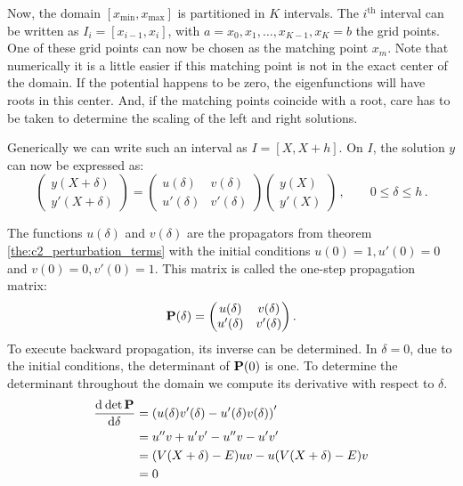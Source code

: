 Now, the domain $[x_\text{min}, x_\text{max}]$ is partitioned in $K$ intervals. The $i^\text{th}$ interval can be written as $I_i = [x_{i-1}, x_{i}]$, with $a = x_0, x_1, \dots, x_{K-1}, x_{K} = b$ the grid points. One of these grid points can now be chosen as the matching point $x_m$. Note that numerically it is a little easier if this matching point is not in the exact center of the domain. If the potential happens to be zero, the eigenfunctions will have roots in this center. And, if the matching points coincide with a root, care has to be taken to determine the scaling of the left and right solutions.

Generically we can write such an interval as $I = [X, X+h]$. On $I$, the solution $y$ can now be expressed as:
\begin{equation}
    \begin{pmatrix}y(X+\delta) \\ y'(X+\delta)\end{pmatrix}
    = \begin{pmatrix} u(\delta) & v(\delta) \\ u'(\delta) & v'(\delta) \end{pmatrix} \begin{pmatrix} y(X) \\ y'(X) \end{pmatrix} \,, \qquad %
    0 \leq \delta \leq h \,. \label{equ:c2_cpm_propmatrix}
\end{equation}

The functions $u(\delta)$ and $v(\delta)$ are the propagators from theorem \ref{the:c2_perturbation_terms} with the initial conditions $u(0) = 1, u'(0)=0$ and
$v(0) = 0, v'(0)=1$. This matrix is called the one-step propagation matrix:
$$
    \vb{P}(\delta) = \begin{pmatrix} u(\delta) & v(\delta) \\ u'(\delta) & v'(\delta) \end{pmatrix}\text{.}
$$
To execute backward propagation, its inverse can be determined. In $\delta = 0$, due to the initial conditions, the determinant of $\vb{P}(0)$ is one. To determine the determinant throughout the domain we compute its derivative with respect to $\delta$.
\begin{align*}
    \dv[]{\det\vb{P}}{\delta} & = \left(u(\delta) v'(\delta) - u'(\delta) v(\delta)\right)' \\
                              & = u'' v + u'v' - u''v - u'v'                                \\
                              & =(V(X+\delta) - E) u v - u (V(X+\delta) - E) v              \\
                              & =0
\end{align*}

